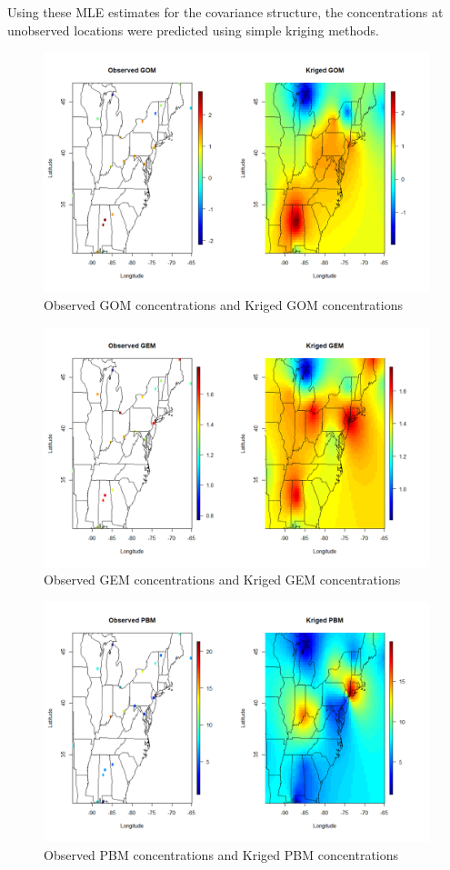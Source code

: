 \documentclass[12pt,a4]{article}
\theoremstyle{plain} %
\begin{document}
Using these MLE estimates for the covariance structure, the concentrations at unobserved locations were predicted using simple kriging methods.
\begin{figure}[H]
    \centering
    \includegraphics[width=0.7\linewidth]{krig_GOM.png}
    \caption{Observed GOM concentrations and Kriged GOM concentrations}
\end{figure}
\begin{figure}[H]
    \centering
    \includegraphics[width=0.7\linewidth]{krig_GEM.png}
    \caption{Observed GEM concentrations and Kriged GEM concentrations}
\end{figure}
\begin{figure}[H]
    \centering
    \includegraphics[width=0.7\linewidth]{krig_PBM.png}
    \caption{Observed PBM concentrations and Kriged PBM concentrations}
\end{figure}
\end{document}
